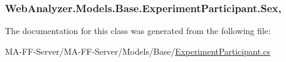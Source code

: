 \subsubsection[{Sex}]{ Web\+Analyzer.\+Models.\+Base.\+Experiment\+Participant.\+Sex\hspace{0.3cm}{\ttfamily [get]}, {\ttfamily [set]}}\label{class_web_analyzer_1_1_models_1_1_base_1_1_experiment_participant_af836bfc33d73671eec06864ce395b9a2}


The documentation for this class was generated from the following file\+:\begin{DoxyCompactItemize}
\item 
M\+A-\/\+F\+F-\/\+Server/\+M\+A-\/\+F\+F-\/\+Server/\+Models/\+Base/\hyperlink{_experiment_participant_8cs}{Experiment\+Participant.\+cs}\end{DoxyCompactItemize}
